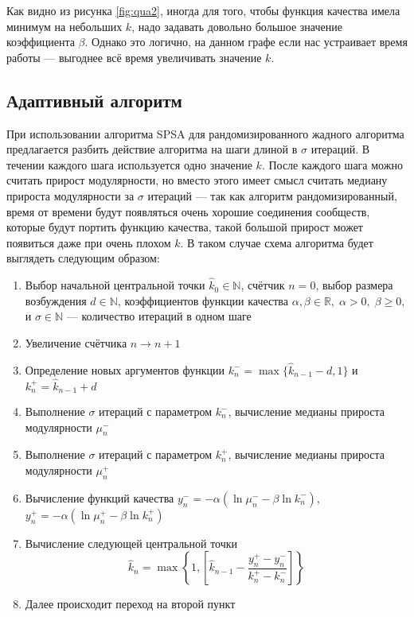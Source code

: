 Как видно из рисунка \ref{fig:qua2}, иногда для того, чтобы функция качества имела минимум на небольших $k$, надо задавать довольно большое значение коэффициента $\beta$. Однако это логично, на данном графе если нас устраивает время работы --- выгоднее всё время увеличивать значение $k$.



\subsection{Адаптивный алгоритм}

При использовании алгоритма SPSA для рандомизированного жадного алгоритма предлагается разбить действие алгоритма на шаги длиной в $\sigma$ итераций. В течении каждого шага используется одно значение $k$. После каждого шага можно считать прирост модулярности, но вместо этого имеет смысл считать медиану прироста модулярности за $\sigma$ итераций --- так как алгоритм рандомизированный, время от времени будут появляться очень хорошие соединения сообществ, которые будут портить функцию качества, такой большой прирост может появиться даже при очень плохом $k$. В таком случае схема алгоритма будет выглядеть следующим образом:

\begin{enumerate}
	\item Выбор начальной центральной точки $\hat{k}_0 \in \mathbb{N}$, счётчик $n = 0$, выбор размера возбуждения $d \in \mathbb{N}$, коэффициентов функции качества $\alpha, \beta \in \mathbb{R},\; \alpha > 0,\;\beta \ge 0$, и $\sigma \in \mathbb{N}$ --- количество итераций в одном шаге
	\item Увеличение счётчика $n \rightarrow n + 1$
	\item Определение новых аргументов функции $k_{n}^{-} = \max\{\hat{k}_{n - 1} - d, 1\}$ и $k_{n}^{+}=\hat{k}_{n - 1} + d$
	\item Выполнение $\sigma$ итераций с параметром $k_{n}^{-}$, вычисление медианы прироста модулярности $\mu_n^{-}$
	\item Выполнение $\sigma$ итераций с параметром $k_{n}^{+}$, вычисление медианы прироста модулярности $\mu_n^{+}$
	\item Вычисление функций качества $y_n^{-} = -\alpha (\ln \mu_n^{-} - \beta \ln k_n^{-})$, $y_n^{+} = -\alpha (\ln \mu_n^{+} - \beta \ln k_n^{+})$
	\item Вычисление следующей центральной точки
	\begin{equation} \label{eq:arg-centre}
		\hat{k}_n = \max\left\{1, \left[\hat{k}_{n - 1} - \frac{y_n^{+} - y_n^{-}}{k_n^{+} - k_n^{-}}\right]\right\}
	\end{equation}
	\item Далее происходит переход на второй пункт
\end{enumerate}

